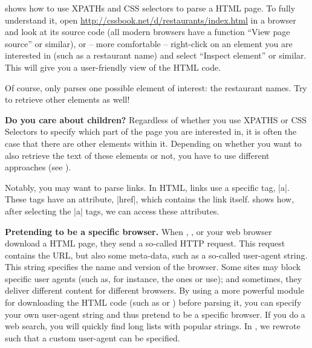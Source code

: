  shows how to use XPATHs and CSS selectors to parse
a HTML page. To fully understand it, open
\url{http://cssbook.net/d/restaurants/index.html} in a browser and
look at its source code (all modern browsers have a function ``View
page source'' or similar), or -- more comfortable -- right-click on an
element you are interested in (such as a restaurant name) and select
``Inspect element'' or similar. This will give you a user-friendly
view of the HTML code.



Of course,  only parses one possible element of interest: the restaurant names. Try to retrieve other elements as well!

\begin{feature}\textbf{Do you care about children?}
Regardless of whether you use XPATHS or CSS Selectors to specify which part of the page you are interested in, it is often the case that there are other elements within it. Depending on whether you want to also retrieve the text of these elements or not, you have to use different approaches (see ).
\end{feature}



Notably, you may want to parse links. In HTML, links use a specific tag, |a|. These tags have an attribute, |href|, which contains the link itself.  shows how, after selecting the |a| tags, we can access these attributes. 




\begin{feature}\textbf{Pretending to be a specific browser.}  When , , or your web browser download a HTML page, they send a so-called HTTP request. This request contains the URL, but also some meta-data, such as a so-called user-agent string. This string specifies the name and version of the browser. Some sites may block specific user agents (such as, for instance, the ones  or  use); and sometimes, they deliver different content for different browsers. By using a more powerful module for downloading the HTML code (such as  or ) before parsing it, you can specify your own user-agent string and thus pretend to be a specific browser. If you do a web search, you will quickly find long lists with popular strings. In , we rewrote  such that a custom user-agent can be specified. 
\end{feature}

